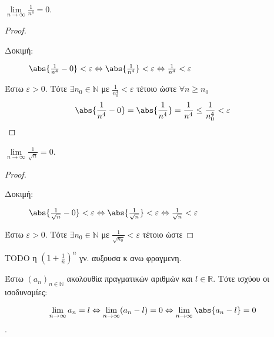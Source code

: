 \documentclass[main.tex]{subfiles}
\begin{document}
\begin{examples}
\begin{enumerate}[i)]
        \item $ \lim\limits_{n \to \infty} \frac{1}{n^{4}} = 0 $. 
            \begin{proof}
            \item {}
                \begin{description}
                    \item[Δοκιμή:]$ \abs{\frac{1}{n^{4}} - 0} < \varepsilon 
                        \Leftrightarrow \abs{\frac{1}{n^{4}}} < \varepsilon 
                        \Leftrightarrow \frac{1}{n^{4}} < \varepsilon $
                \end{description}
                Έστω $ \varepsilon >0 $. Τότε $ \exists n_{0}  \in 
                \mathbb{N}$ με $ \frac{1}{n_{0}^{4}} < \varepsilon $ 
                τέτοιο ώστε $ \forall n \geq n_{0} $ 
                \[
                    \abs{\frac{1}{n^{4}} - 0 } = \abs{\frac{1}{n^{4}}} 
                    = \frac{1}{n^{4}} \leq \frac{1}{n_{0}^{4}} < \varepsilon
                \] 
            \end{proof}

        \item $ \lim\limits_{n \to \infty} \frac{1}{\sqrt{n}} = 0$.
            \begin{proof}
            \item {}
                \begin{description}
                    \item[Δοκιμή:] $ \abs{\frac{1}{\sqrt{n}}-0 } 
                        < \varepsilon 
                        \Leftrightarrow \abs{\frac{1}{\sqrt{n}} } < 
                        \varepsilon 
                        \Leftrightarrow \frac{1}{\sqrt{n}} < 
                        \varepsilon $
                \end{description}
                Έστω $ \varepsilon > 0 $. Τότε $ \exists n_{0} \in 
                \mathbb{N} $
                με $ \frac{1}{\sqrt{n_{0}}} < \varepsilon $ τέτοιο ώστε 
            \end{proof}
    \end{enumerate}
\end{examples}

TODO η $ (1+ \frac{1}{n} )^{n} $ γν. αυξουσα κ ανω φραγμενη.

\begin{prop}
    Έστω $ (a_{n})_{n \in \mathbb{N}} $ ακολουθία πραγματικών αριθμών και 
    $ l \in \mathbb{R} $. Τότε ισχύου οι ισοδυναμίες:

    \[ \lim_{n \to \infty} a_{n} = l \Leftrightarrow \lim_{n \to \infty} (
        a_{n}- l) = 0 
    \Leftrightarrow \lim_{n \to \infty} \abs{a_{n}-l} = 0\].
\end{prop}
\end{document}
